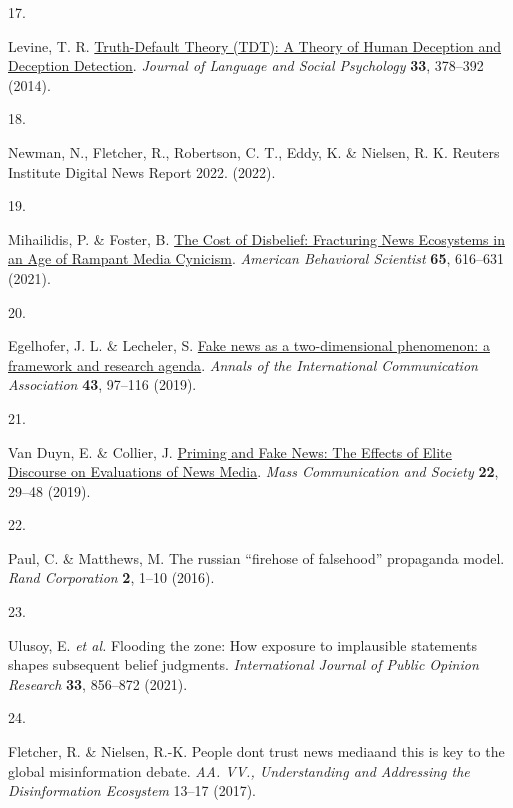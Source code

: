 \documentclass[
  doc,floatsintext]{apa6}
\newlength{\cslhangindent}
\newlength{\csllabelwidth}
\newenvironment{CSLReferences}[2] %
 {\begin{list}{}{%
  \setlength{\itemindent}{0pt}
  \setlength{\leftmargin}{0pt}
  \setlength{\parsep}{0pt}
  \ifodd #1
   \setlength{\leftmargin}{\cslhangindent}
   \setlength{\itemindent}{-1\cslhangindent}
  \fi
  \setlength{\itemsep}{#2\baselineskip}}}
 {\end{list}}
\newcommand{\CSLLeftMargin}[1]{\parbox[t]{\csllabelwidth}{\strut#1\strut}}
\newcommand{\CSLRightInline}[1]{\parbox[t]{\linewidth - \csllabelwidth}{\strut#1\strut}}
\begin{document}
\begin{CSLReferences}{0}{0}
\CSLLeftMargin{17. }%
\CSLRightInline{Levine, T. R. \href{https://doi.org/10.1177/0261927X14535916}{Truth-Default Theory (TDT): A Theory of Human Deception and Deception Detection}. \emph{Journal of Language and Social Psychology} \textbf{33}, 378--392 (2014).}

\CSLLeftMargin{18. }%
\CSLRightInline{Newman, N., Fletcher, R., Robertson, C. T., Eddy, K. \& Nielsen, R. K. Reuters Institute Digital News Report 2022. (2022).}

\CSLLeftMargin{19. }%
\CSLRightInline{Mihailidis, P. \& Foster, B. \href{https://doi.org/10.1177/0002764220978470}{The Cost of Disbelief: Fracturing News Ecosystems in an Age of Rampant Media Cynicism}. \emph{American Behavioral Scientist} \textbf{65}, 616--631 (2021).}

\CSLLeftMargin{20. }%
\CSLRightInline{Egelhofer, J. L. \& Lecheler, S. \href{https://doi.org/10.1080/23808985.2019.1602782}{Fake news as a two-dimensional phenomenon: a framework and research agenda}. \emph{Annals of the International Communication Association} \textbf{43}, 97--116 (2019).}

\CSLLeftMargin{21. }%
\CSLRightInline{Van Duyn, E. \& Collier, J. \href{https://doi.org/10.1080/15205436.2018.1511807}{Priming and Fake News: The Effects of Elite Discourse on Evaluations of News Media}. \emph{Mass Communication and Society} \textbf{22}, 29--48 (2019).}

\CSLLeftMargin{22. }%
\CSLRightInline{Paul, C. \& Matthews, M. The russian {``}firehose of falsehood{''} propaganda model. \emph{Rand Corporation} \textbf{2}, 1--10 (2016).}

\CSLLeftMargin{23. }%
\CSLRightInline{Ulusoy, E. \emph{et al.} Flooding the zone: How exposure to implausible statements shapes subsequent belief judgments. \emph{International Journal of Public Opinion Research} \textbf{33}, 856--872 (2021).}

\CSLLeftMargin{24. }%
\CSLRightInline{Fletcher, R. \& Nielsen, R.-K. People dont trust news media{\textendash}and this is key to the global misinformation debate. \emph{AA. VV., Understanding and Addressing the Disinformation Ecosystem} 13--17 (2017).}


\end{CSLReferences}
\end{document}
